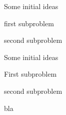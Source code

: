 \documentclass[12pt]{simple-assignment} %
\begin{document}
\begin{problem}
    Some initial ideas
    \begin{subproblem}
        first subproblem
    \end{subproblem}
    \begin{subproblem}
        second subproblem
    \end{subproblem}
\end{problem}

\begin{problem}
    Some initial ideas
    \begin{subproblem}
        First subproblem
    \end{subproblem}
    \begin{subproblem}
        second subproblem
    \end{subproblem}
\end{problem}

\begin{problem}
    bla
\end{problem}
\end{document}
